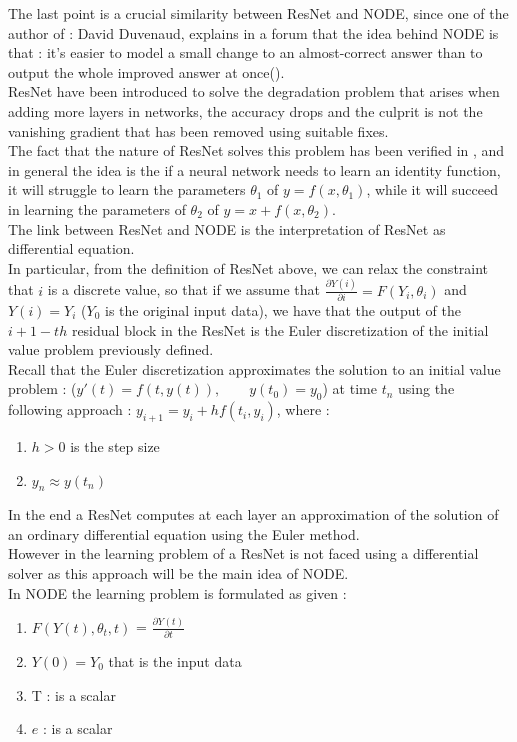 \documentclass[LaM,binding=0.6cm]{sapthesis}
\begin{document}
The last point is a crucial similarity between ResNet and NODE, since one of the author of \cite{2} : David Duvenaud, explains in a forum that the idea behind NODE is that : it's easier to model a small change to an almost-correct answer than to output the whole improved answer at once(\cite{8}).\\ResNet have been introduced to solve the degradation problem that arises when adding more layers in networks, the accuracy drops and the culprit is not the vanishing gradient that has been removed using suitable fixes.\\The fact that the nature of ResNet solves this problem has been verified in \cite{6}, and in general the idea is the if a neural network needs to learn an identity function, it will struggle to learn the parameters $\theta_1$ of $y=f(x,\theta_1)$, while it will succeed in learning the parameters of $\theta_2$ of $y=x+f(x,\theta_2)$.\\The link between ResNet and NODE is the interpretation of ResNet as differential equation.\\In particular, from the definition of ResNet above, we can relax the constraint that $i$ is a discrete value, so that if we assume that $\frac{\partial Y(i)}{ \partial i}=F(Y_{i},\theta_{i})$ and $Y(i)=Y_i$ ($Y_0$ is the original input data), we have that the output of the $i+1-th$ residual block in the ResNet is the Euler discretization of the initial value problem previously defined.\\Recall that the Euler discretization approximates the solution to an initial value problem : (${\displaystyle y'(t)=f(t,y(t)),\qquad y(t_{0})=y_{0}}$)  at time $t_n$ using the following approach : $y_{i+1}=y_{i}+hf(t_{i},y_{i})$, where :
\begin{enumerate}
\item $h>0$ is the step size
\item $ y_{n}\approx y(t_{n})$
\end{enumerate}
In the end a ResNet computes at each layer an approximation of the solution of an ordinary differential equation using the Euler method.\\However in \cite{9} the learning problem of a ResNet is not faced using a differential solver as this approach will be the main idea of NODE.\\In NODE the learning problem is formulated as given :
\begin{enumerate}
\item $F(Y(t),\theta_{t},t)$ = $\frac{\partial Y(t)}{ \partial t}$
\item $Y(0)=Y_0$ that is the input data
\item T : is a scalar
\item $e$ : is a scalar
\end{enumerate}
\end{document}
